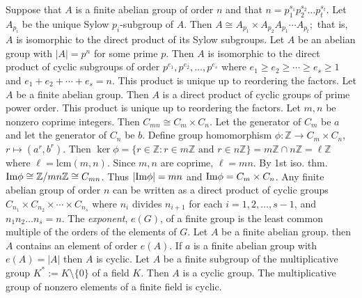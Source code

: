  Suppose that $A$ is a finite abelian group of order $n$ and that $n = p^{s_1}_{1} p^{s_2}_{2} \ldots p^{s_t}_{t}$. Let $A_{p_i}$ be the unique Sylow $p_i$-subgroup of $A$. Then $A \cong A_{p_1} \times A_{p_2} A_{p_1} \cdots A_{p_t};$ that is, $A$ is isomorphic to the direct product of its Sylow subgroups.
 Let $A$ be an abelian group with $|A| = p^n$ for some prime $p$. Then $A$ is isomorphic to the direct product of cyclic subgroups of order $p^{e_1}, p^{e_2}, \ldots, p^{e_s}$ where $e_1 \ge e_2 \ge \cdots \ge e_s \ge 1$ and $e_1 + e_2 + \cdots + e_s = n$. This product is unique up to reordering the factors.
 Let $A$ be a finite abelian group. Then $A$ is a direct product of cyclic groups of prime power order. This product is unique up to reordering the factors.
 Let $m, n$ be nonzero coprime integers. Then $C_{mn} \cong C_m \times C_n$. 
\wpf{} Let the generator of $C_m$ be $a$ and let the generator of $C_n$ be $b$. Define group homomorphism $\phi : \mathbb{Z} \to C_m \times C_n$, $r \mapsto (a^r, b^r)$. Then $\ker\phi = \{r \in \mathbb{Z} : r \in m\mathbb{Z} \text{ and } r \in n\mathbb{Z}\} = m\mathbb{Z} \cap n\mathbb{Z} = \ell \mathbb{Z}$ where $\ell = \mathrm{lcm}(m,n)$. Since $m,n$ are coprime, $\ell = mn$. By 1st iso. thm. $\text{Im}\phi \cong \mathbb{Z}/mn\mathbb{Z} \cong C_{mn}$. Thus $|\text{Im}\phi| = mn$ and $\text{Im}\phi = C_m \times C_n$.
 Any finite abelian group of order $n$ can be written as a direct product of cyclic groups $C_{n_1} \times C_{n_2} \times \cdots \times C_{n_s}$ where $n_i$ divides $n_{i+1}$ for each $i = 1,2,\ldots,s-1$, and $n_1n_2\ldots n_s = n$.
  The \textit{exponent}, $e(G)$, of a finite group is the least common multiple of the orders of the elements of $G$. 
 Let $A$ be a finite abelian group. then $A$ contains an element of order $e(A)$.
 If $a$ is a finite abelian group with $e(A) = |A|$ then $A$ is cyclic.
 Let $A$ be a finite subgroup of the multiplicative group $K^* := K \setminus \{0\}$ of a field $K$. Then $A$ is a cyclic group.
 The multiplicative group of nonzero elements of a finite field is cyclic.